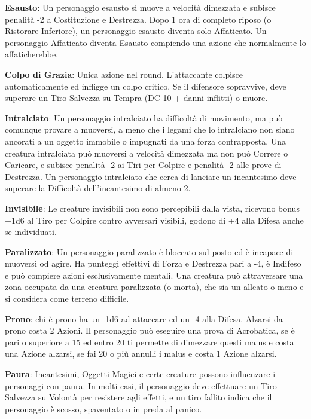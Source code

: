 \documentclass[a4paper,12 pt,openany]{book}
\begin{document}
\begin{textblock*}{19 cm}
\begin{multicols}{2}
			\textbf{Esausto}: Un personaggio esausto si muove a velocità dimezzata e subisce penalità -2 a Costituzione e Destrezza. Dopo 1 ora di completo riposo (o Ristorare Inferiore), un personaggio esausto diventa solo Affaticato. Un personaggio Affaticato diventa Esausto compiendo una azione che normalmente lo affaticherebbe.
			
			\textbf{Colpo di Grazia}: Unica azione nel round. L'attaccante colpisce automaticamente ed infligge un colpo critico. Se il difensore sopravvive, deve superare un Tiro Salvezza su Tempra (DC 10 + danni inflitti) o muore.
			
			\textbf{Intralciato}: Un personaggio intralciato ha difficoltà di movimento, ma può comunque provare a muoversi, a meno che i legami che lo intralciano non siano ancorati a un oggetto immobile o impugnati da una forza contrapposta.
			Una creatura intralciata può muoversi a velocità dimezzata ma non può Correre o Caricare, e subisce penalità -2 ai Tiri per Colpire e penalità -2 alle prove di Destrezza.
			Un personaggio intralciato che cerca di lanciare un incantesimo deve superare la Difficoltà dell'incantesimo di almeno 2.
			
			\textbf{Invisibile}: Le creature invisibili non sono percepibili dalla vista, ricevono bonus +1d6 al Tiro per Colpire contro avversari visibili, godono di +4 alla Difesa anche se individuati.
			
			\textbf{Paralizzato}: Un personaggio paralizzato è bloccato sul posto ed è incapace di muoversi od agire. Ha punteggi effettivi di Forza e Destrezza pari a -4, è Indifeso e può compiere azioni esclusivamente mentali.
			Una creatura può attraversare una zona occupata da una creatura paralizzata (o morta), che sia un alleato o meno e si considera come terreno difficile.
			
			\textbf{Prono}: chi è prono ha un -1d6 ad attaccare ed un -4 alla Difesa. Alzarsi da prono costa 2 Azioni.
			Il personaggio può eseguire una prova di Acrobatica, se è pari o superiore a 15 ed entro 20 ti permette di dimezzare questi malus e costa una Azione alzarsi, se fai 20 o più annulli i malus e costa 1 Azione alzarsi.
			
			\textbf{Paura}: Incantesimi, Oggetti Magici e certe creature possono influenzare i personaggi con paura. In molti casi, il personaggio deve effettuare un Tiro Salvezza su Volontà per resistere agli effetti, e un tiro fallito indica che il personaggio è scosso, spaventato o in preda al panico.
			

\end{multicols}
\end{textblock*}
\end{document}
